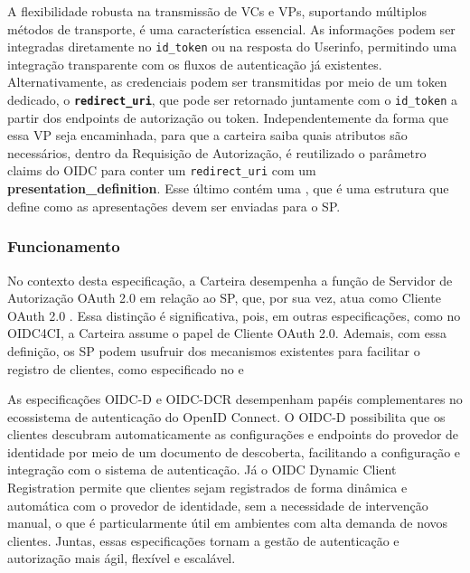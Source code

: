A flexibilidade robusta na transmissão de \acs{VC}s e \acs{VP}s, suportando múltiplos métodos de transporte, é uma característica essencial. As informações podem ser integradas diretamente no \texttt{id\_token} ou na resposta do Userinfo, permitindo uma integração transparente com os fluxos de autenticação já existentes. Alternativamente, as credenciais podem ser transmitidas por meio de um token dedicado, o \textbf{\texttt{redirect\_uri}}, que pode ser retornado juntamente com o \texttt{id\_token} a partir dos endpoints de autorização ou token. Independentemente da forma que essa \acs{VP} seja encaminhada, para que a carteira saiba quais atributos são necessários, dentro da Requisição de Autorização, é reutilizado o parâmetro claims do \acs{OIDC} para conter um \texttt{redirect\_uri} com um \textbf{presentation\_definition}. Esse último contém uma  \cite{presentation-exchange}, que é uma estrutura que define como as apresentações devem ser enviadas para o \acs{SP}.


\subsubsection{Funcionamento}{\label{subsubsection:oidc4vc}}

No contexto desta especificação, a Carteira desempenha a função de Servidor de Autorização OAuth 2.0 em relação ao \acs{SP}, que, por sua vez, atua como Cliente OAuth 2.0 \cite{OIDC4VP2023}. Essa distinção é significativa, pois, em outras especificações, como no \acs{OIDC4CI}, a Carteira assume o papel de Cliente OAuth 2.0. Ademais, com essa definição, os \acs{SP} podem usufruir dos mecanismos existentes para facilitar o registro de clientes, como especificado no  \cite{sakimura2023openidDiscovery} e  \cite{sakimura2023openid-dcr}

As especificações \acs{OIDC-D} e \acs{OIDC-DCR} desempenham papéis complementares no ecossistema de autenticação do OpenID Connect. O \acs{OIDC-D} possibilita que os clientes descubram automaticamente as configurações e endpoints do provedor de identidade por meio de um documento de descoberta, facilitando a configuração e integração com o sistema de autenticação. Já o OIDC Dynamic Client Registration permite que clientes sejam registrados de forma dinâmica e automática com o provedor de identidade, sem a necessidade de intervenção manual, o que é particularmente útil em ambientes com alta demanda de novos clientes. Juntas, essas especificações tornam a gestão de autenticação e autorização mais ágil, flexível e escalável.

